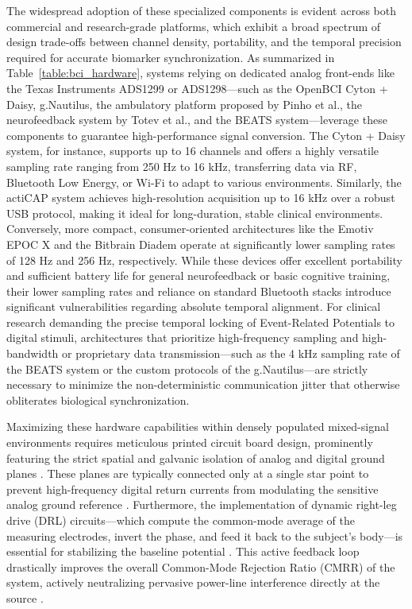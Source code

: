 The widespread adoption of these specialized components is evident across both commercial and research-grade platforms, which exhibit a broad spectrum of design trade-offs between channel density, portability, and the temporal precision required for accurate biomarker synchronization. As summarized in Table~\ref{table:bci_hardware}, systems relying on dedicated analog front-ends like the Texas Instruments ADS1299 or ADS1298---such as the OpenBCI Cyton + Daisy, g.Nautilus, the ambulatory platform proposed by Pinho et al., the neurofeedback system by Totev et al., and the BEATS system---leverage these components to guarantee high-performance signal conversion. The Cyton + Daisy system, for instance, supports up to 16 channels and offers a highly versatile sampling rate ranging from 250 Hz to 16 kHz, transferring data via RF, Bluetooth Low Energy, or Wi-Fi to adapt to various environments. Similarly, the actiCAP system achieves high-resolution acquisition up to 16 kHz over a robust USB protocol, making it ideal for long-duration, stable clinical environments. Conversely, more compact, consumer-oriented architectures like the Emotiv EPOC X and the Bitbrain Diadem operate at significantly lower sampling rates of 128 Hz and 256 Hz, respectively. While these devices offer excellent portability and sufficient battery life for general neurofeedback or basic cognitive training, their lower sampling rates and reliance on standard Bluetooth stacks introduce significant vulnerabilities regarding absolute temporal alignment. For clinical research demanding the precise temporal locking of Event-Related Potentials to digital stimuli, architectures that prioritize high-frequency sampling and high-bandwidth or proprietary data transmission---such as the 4 kHz sampling rate of the BEATS system or the custom protocols of the g.Nautilus---are strictly necessary to minimize the non-deterministic communication jitter that otherwise obliterates biological synchronization.

Maximizing these hardware capabilities within densely populated mixed-signal environments requires meticulous printed circuit board design, prominently featuring the strict spatial and galvanic isolation of analog and digital ground planes \cite{wang2024high}. These planes are typically connected only at a single star point to prevent high-frequency digital return currents from modulating the sensitive analog ground reference \cite{sen2025low}. Furthermore, the implementation of dynamic right-leg drive (DRL) circuits—which compute the common-mode average of the measuring electrodes, invert the phase, and feed it back to the subject's body—is essential for stabilizing the baseline potential \cite{luo2025portable}. This active feedback loop drastically improves the overall Common-Mode Rejection Ratio (\gls{CMRR}) of the system, actively neutralizing pervasive power-line interference directly at the source \cite{wen2025analog}.

